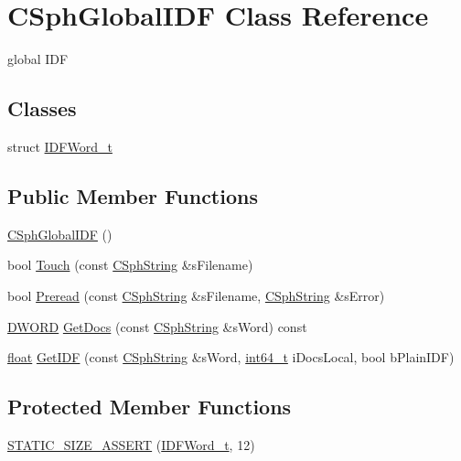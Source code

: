 \hypertarget{classCSphGlobalIDF}{\section{C\-Sph\-Global\-I\-D\-F Class Reference}
\label{classCSphGlobalIDF}
}


global I\-D\-F  


\subsection*{Classes}
\begin{DoxyCompactItemize}
\item 
struct \hyperlink{structCSphGlobalIDF_1_1IDFWord__t}{I\-D\-F\-Word\-\_\-t}
\end{DoxyCompactItemize}
\subsection*{Public Member Functions}
\begin{DoxyCompactItemize}
\item 
\hyperlink{classCSphGlobalIDF_a270cfe60e3805e3f12412b9f467b703e}{C\-Sph\-Global\-I\-D\-F} ()
\item 
bool \hyperlink{classCSphGlobalIDF_a8177f4f96fef06af4bb7ce7c85673d83}{Touch} (const \hyperlink{structCSphString}{C\-Sph\-String} \&s\-Filename)
\item 
bool \hyperlink{classCSphGlobalIDF_a83b078913cfdf875528e89529eef7e13}{Preread} (const \hyperlink{structCSphString}{C\-Sph\-String} \&s\-Filename, \hyperlink{structCSphString}{C\-Sph\-String} \&s\-Error)
\item 
\hyperlink{sphinxstd_8h_a798af1e30bc65f319c1a246cecf59e39}{D\-W\-O\-R\-D} \hyperlink{classCSphGlobalIDF_aa9df2bc312161eceb048349fcaa3dbbb}{Get\-Docs} (const \hyperlink{structCSphString}{C\-Sph\-String} \&s\-Word) const 
\item 
\hyperlink{sphinxexpr_8cpp_a0e0d0739f7035f18f949c2db2c6759ec}{float} \hyperlink{classCSphGlobalIDF_a7dc2122d1cd7a503fc3ec26955f1299b}{Get\-I\-D\-F} (const \hyperlink{structCSphString}{C\-Sph\-String} \&s\-Word, \hyperlink{sphinxstd_8h_a996e72f71b11a5bb8b3b7b6936b1516d}{int64\-\_\-t} i\-Docs\-Local, bool b\-Plain\-I\-D\-F)
\end{DoxyCompactItemize}
\subsection*{Protected Member Functions}
\begin{DoxyCompactItemize}
\item 
\hyperlink{classCSphGlobalIDF_a46c03d0a6358b07c5061b610ef080fa0}{S\-T\-A\-T\-I\-C\-\_\-\-S\-I\-Z\-E\-\_\-\-A\-S\-S\-E\-R\-T} (\hyperlink{structCSphGlobalIDF_1_1IDFWord__t}{I\-D\-F\-Word\-\_\-t}, 12)
\end{DoxyCompactItemize}
